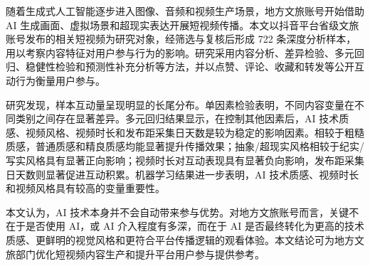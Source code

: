 随着生成式人工智能逐步进入图像、音频和视频生产场景，地方文旅账号开始借助 AI 生成画面、虚拟场景和超现实表达开展短视频传播。本文以抖音平台省级文旅账号发布的相关短视频为研究对象，经筛选与复核后形成 722 条深度分析样本，用以考察内容特征对用户参与行为的影响。研究采用内容分析、差异检验、多元回归、稳健性检验和预测性补充分析等方法，并以点赞、评论、收藏和转发等公开互动行为衡量用户参与。

研究发现，样本互动量呈现明显的长尾分布。单因素检验表明，不同内容变量在不同类别之间存在显著差异。多元回归结果显示，在控制其他因素后，AI 技术质感、视频风格、视频时长和发布距采集日天数是较为稳定的影响因素。相较于粗糙质感，普通质感和精良质感均能显著提升传播效果；抽象/超现实风格相较于纪实/写实风格具有显著正向影响；视频时长对互动表现具有显著负向影响，发布距采集日天数则显著促进互动积累。机器学习结果进一步表明，AI 技术质感、视频时长和视频风格具有较高的变量重要性。

本文认为，AI 技术本身并不会自动带来参与优势。对地方文旅账号而言，关键不在于是否使用 AI，或 AI 介入程度有多深，而在于 AI 是否最终转化为更高的技术质感、更鲜明的视觉风格和更符合平台传播逻辑的观看体验。本文结论可为地方文旅部门优化短视频内容生产和提升平台用户参与提供参考。
